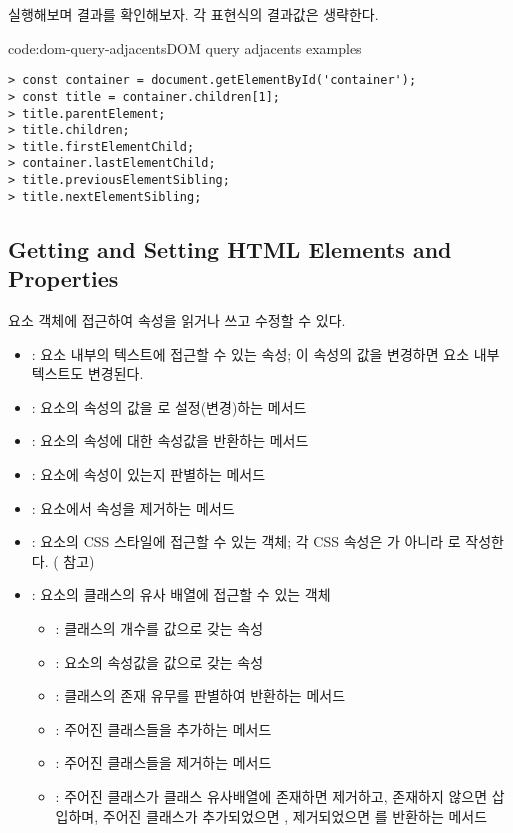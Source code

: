 \를 실행해보며 결과를 확인해보자. 각 표현식의 결과값은 생략한다.

\begin{code}{code:dom-query-adjacents}{DOM query adjacents examples}
\begin{verbatim}
> const container = document.getElementById('container');
> const title = container.children[1];
> title.parentElement;
> title.children;
> title.firstElementChild;
> container.lastElementChild;
> title.previousElementSibling;
> title.nextElementSibling;
\end{verbatim}
\end{code}

\subsection*{Getting and Setting HTML Elements and Properties}

요소 객체에 접근하여 속성을 읽거나 쓰고 수정할 수 있다.

\begin{itemize}
    \item {}: 요소 내부의 텍스트에 접근할 수 있는 속성; 이 속성의 값을 변경하면 요소 내부 텍스트도 변경된다.
    \item {}: 요소의  속성의 값을 로 설정(변경)하는 메서드
    \item {}: 요소의  속성에 대한 속성값을 반환하는 메서드
    \item {}: 요소에  속성이 있는지 판별하는 메서드
    \item {}: 요소에서  속성을 제거하는 메서드
    \item {}: 요소의 CSS 스타일에 접근할 수 있는 객체; 각 CSS 속성은 가 아니라 로 작성한다. ( 참고)
    \item {}: 요소의 클래스의 유사 배열에 접근할 수 있는 객체
    \begin{itemize}
        \item {}: 클래스의 개수를 값으로 갖는 속성
        \item {}: 요소의  속성값을 값으로 갖는 속성
        \item {}: 클래스의 존재 유무를 판별하여 반환하는 메서드
        \item {}: 주어진 클래스들을 추가하는 메서드
        \item {}: 주어진 클래스들을 제거하는 메서드
        \item {}: 주어진 클래스가 클래스 유사배열에 존재하면 제거하고, 존재하지 않으면 삽입하며, 주어진 클래스가 추가되었으면 , 제거되었으면 를 반환하는 메서드
    \end{itemize}
\end{itemize}


